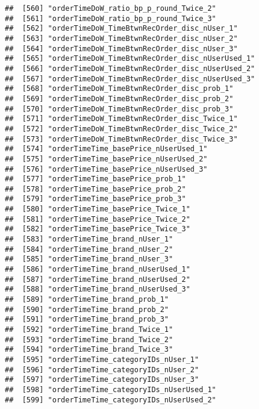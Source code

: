\documentclass[10pt]{report}
\begin{document}
\begin{verbatim}
##  [560] "orderTimeDoW_ratio_bp_p_round_Twice_2"                
##  [561] "orderTimeDoW_ratio_bp_p_round_Twice_3"                
##  [562] "orderTimeDoW_TimeBtwnRecOrder_disc_nUser_1"           
##  [563] "orderTimeDoW_TimeBtwnRecOrder_disc_nUser_2"           
##  [564] "orderTimeDoW_TimeBtwnRecOrder_disc_nUser_3"           
##  [565] "orderTimeDoW_TimeBtwnRecOrder_disc_nUserUsed_1"       
##  [566] "orderTimeDoW_TimeBtwnRecOrder_disc_nUserUsed_2"       
##  [567] "orderTimeDoW_TimeBtwnRecOrder_disc_nUserUsed_3"       
##  [568] "orderTimeDoW_TimeBtwnRecOrder_disc_prob_1"            
##  [569] "orderTimeDoW_TimeBtwnRecOrder_disc_prob_2"            
##  [570] "orderTimeDoW_TimeBtwnRecOrder_disc_prob_3"            
##  [571] "orderTimeDoW_TimeBtwnRecOrder_disc_Twice_1"           
##  [572] "orderTimeDoW_TimeBtwnRecOrder_disc_Twice_2"           
##  [573] "orderTimeDoW_TimeBtwnRecOrder_disc_Twice_3"           
##  [574] "orderTimeTime_basePrice_nUserUsed_1"                  
##  [575] "orderTimeTime_basePrice_nUserUsed_2"                  
##  [576] "orderTimeTime_basePrice_nUserUsed_3"                  
##  [577] "orderTimeTime_basePrice_prob_1"                       
##  [578] "orderTimeTime_basePrice_prob_2"                       
##  [579] "orderTimeTime_basePrice_prob_3"                       
##  [580] "orderTimeTime_basePrice_Twice_1"                      
##  [581] "orderTimeTime_basePrice_Twice_2"                      
##  [582] "orderTimeTime_basePrice_Twice_3"                      
##  [583] "orderTimeTime_brand_nUser_1"                          
##  [584] "orderTimeTime_brand_nUser_2"                          
##  [585] "orderTimeTime_brand_nUser_3"                          
##  [586] "orderTimeTime_brand_nUserUsed_1"                      
##  [587] "orderTimeTime_brand_nUserUsed_2"                      
##  [588] "orderTimeTime_brand_nUserUsed_3"                      
##  [589] "orderTimeTime_brand_prob_1"                           
##  [590] "orderTimeTime_brand_prob_2"                           
##  [591] "orderTimeTime_brand_prob_3"                           
##  [592] "orderTimeTime_brand_Twice_1"                          
##  [593] "orderTimeTime_brand_Twice_2"                          
##  [594] "orderTimeTime_brand_Twice_3"                          
##  [595] "orderTimeTime_categoryIDs_nUser_1"                    
##  [596] "orderTimeTime_categoryIDs_nUser_2"                    
##  [597] "orderTimeTime_categoryIDs_nUser_3"                    
##  [598] "orderTimeTime_categoryIDs_nUserUsed_1"                
##  [599] "orderTimeTime_categoryIDs_nUserUsed_2"                

\end{verbatim}
\end{document}
